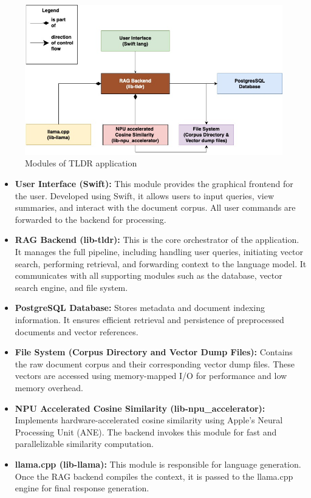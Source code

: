 \begin{figure}[H]
    \centering
    \includegraphics[width=1.0\linewidth]{images/tldr-app-modules.jpg}
    \caption{Modules of TLDR application}
    \label{fig:tldr_modules}
\end{figure}

\begin{itemize}
    \item \textbf{User Interface (Swift):} This module provides the graphical frontend for the user. Developed using Swift, it allows users to input queries, view summaries, and interact with the document corpus. All user commands are forwarded to the backend for processing.

    \item \textbf{RAG Backend (lib-tldr):} This is the core orchestrator of the application. It manages the full pipeline, including handling user queries, initiating vector search, performing retrieval, and forwarding context to the language model. It communicates with all supporting modules such as the database, vector search engine, and file system.

    \item \textbf{PostgreSQL Database:} Stores metadata and document indexing information. It ensures efficient retrieval and persistence of preprocessed documents and vector references.

    \item \textbf{File System (Corpus Directory and Vector Dump Files):} Contains the raw document corpus and their corresponding vector dump files. These vectors are accessed using memory-mapped I/O for performance and low memory overhead.


    \item \textbf{NPU Accelerated Cosine Similarity (lib-npu\_accelerator):} Implements hardware-accelerated cosine similarity using Apple's Neural Processing Unit (ANE). The backend invokes this module for fast and parallelizable similarity computation.

    \item \textbf{llama.cpp (lib-llama):} This module is responsible for language generation. Once the RAG backend compiles the context, it is passed to the llama.cpp engine for final response generation.
\end{itemize}


